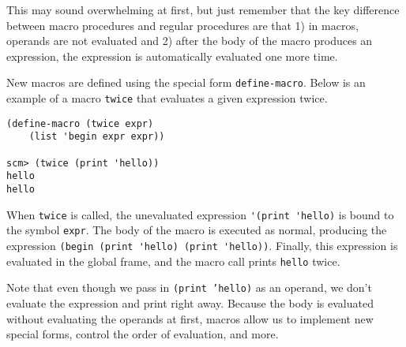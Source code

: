 This may sound overwhelming at first, but just remember that the key difference between macro procedures and regular procedures are that 1) in macros, operands are not evaluated and 2) after the body of the macro produces an expression, the expression is automatically evaluated one more time.  

New macros are defined using the special form \lstinline{define-macro}. Below is an example of a macro \lstinline{twice} that evaluates a given expression twice. 

\begin{lstlisting}
(define-macro (twice expr)
    (list 'begin expr expr))

scm> (twice (print 'hello))
hello
hello
\end{lstlisting}

When \texttt{twice} is called, the unevaluated expression \lstinline{'(print 'hello)} is bound to the symbol \lstinline{expr}. The body of the macro is executed as normal, producing the expression \lstinline{(begin (print 'hello) (print 'hello))}. Finally, this expression is evaluated in the global frame, and the macro call prints \lstinline{hello} twice. 

Note that even though we pass in \texttt{(print 'hello)} as an operand, we don't evaluate the expression and print right away. Because the body is evaluated without evaluating the operands at first, macros allow us to implement new special forms, control the order of evaluation, and more. 